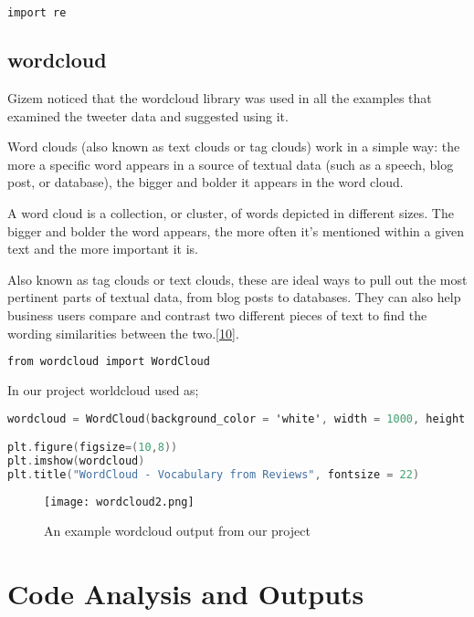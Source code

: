 \documentclass[onecolumn]{article}
\begin{document}
\begin{lstlisting}[language=C, caption= re]
 import re
\end{lstlisting}

\subsection{wordcloud}

Gizem  noticed that the wordcloud library was used in all the examples that examined the tweeter data and suggested using it.

Word clouds (also known as text clouds or tag clouds) work in a simple way: the more a specific word appears in a source of textual data (such as a speech, blog post, or database), the bigger and bolder it appears in the word cloud.

A word cloud is a collection, or cluster, of words depicted in different sizes. The bigger and bolder the word appears, the more often it’s mentioned within a given text and the more important it is.

Also known as tag clouds or text clouds, these are ideal ways to pull out the most pertinent parts of textual data, from blog posts to databases. They can also help business users compare and contrast two different pieces of text to find the wording similarities between the two.\href{https://boostlabs.com/blog/what-are-word-clouds-value-simple-visualizations/}{ {[10]}}.

\begin{lstlisting}[language=C, caption= wordcloud]
from wordcloud import WordCloud
\end{lstlisting}

In our project worldcloud used as;

\begin{lstlisting}[language=C, caption= wordcloud]
wordcloud = WordCloud(background_color = 'white', width = 1000, height = 1000).generate_from_frequencies(dict(words_frequency))

plt.figure(figsize=(10,8))
plt.imshow(wordcloud)
plt.title("WordCloud - Vocabulary from Reviews", fontsize = 22)
\end{lstlisting}


\begin{figure}[ht!]
\centering
\texttt{[image: wordcloud2.png]}
\caption{An example wordcloud output from our project\label{}}
\end{figure}

\section{Code Analysis and Outputs}
\end{document}
